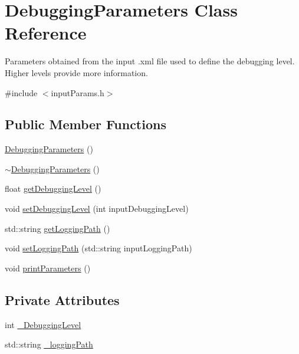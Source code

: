 \hypertarget{classDebuggingParameters}{\section{Debugging\-Parameters Class Reference}
\label{classDebuggingParameters}
}


Parameters obtained from the input .xml file used to define the debugging level. Higher levels provide more information.  




{\ttfamily \#include $<$input\-Params.\-h$>$}

\subsection*{Public Member Functions}
\begin{DoxyCompactItemize}
\item 
\hyperlink{classDebuggingParameters_a452365eda2bcf1cc65e12035a46db3a7}{Debugging\-Parameters} ()
\item 
\hyperlink{classDebuggingParameters_aa357ce5f7f8a28c416600a476ceda19e}{$\sim$\-Debugging\-Parameters} ()
\item 
float \hyperlink{classDebuggingParameters_a9b6f77938b872e68ff1af1a9fe67462f}{get\-Debugging\-Level} ()
\item 
void \hyperlink{classDebuggingParameters_aa4cf97d9b402a13aa6ea7dc6e2458eea}{set\-Debugging\-Level} (int input\-Debugging\-Level)
\item 
std\-::string \hyperlink{classDebuggingParameters_af94cb876bb95d9ca2d8387bebecf4305}{get\-Logging\-Path} ()
\item 
void \hyperlink{classDebuggingParameters_af8661df90e7e66c6370628672ce1b56b}{set\-Logging\-Path} (std\-::string input\-Logging\-Path)
\item 
void \hyperlink{classDebuggingParameters_a9de957b38ff631859ddd74e1e35b7bda}{print\-Parameters} ()
\end{DoxyCompactItemize}
\subsection*{Private Attributes}
\begin{DoxyCompactItemize}
\item 
int \hyperlink{classDebuggingParameters_af5ab76869fd2a2a5f85c19409bead492}{\-\_\-\-Debugging\-Level}
\item 
std\-::string \hyperlink{classDebuggingParameters_a94b9ef8a3703ab45842fac38c2f5a95b}{\-\_\-logging\-Path}
\end{DoxyCompactItemize}


